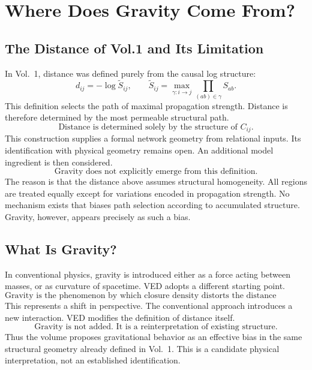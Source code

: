 \section{Where Does Gravity Come From?}
\label{sec:gravity_distance}

\subsection{The Distance of Vol.1 and Its Limitation}

In Vol.~1, distance was defined purely from the causal log structure:
\begin{equation}
  d_{ij} = -\log \tilde{S}_{ij},
  \qquad
  \tilde{S}_{ij} = \max_{\gamma: i\to j} \prod_{(ab)\in\gamma} S_{ab}.
\end{equation}
This definition selects the path of maximal propagation strength.
Distance is therefore determined by the most permeable structural path.
\begin{equation}
  \boxed{\text{Distance is determined solely by the structure of } C_{ij}.}
\end{equation}
This construction supplies a formal network geometry from relational inputs.
Its identification with physical geometry remains open.  An additional model
ingredient is then considered.
\begin{equation}
  \boxed{\text{Gravity does not explicitly emerge from this definition.}}
\end{equation}
The reason is that the distance above assumes structural homogeneity.
All regions are treated equally except for variations encoded in propagation strength.
No mechanism exists that biases path selection according to accumulated structure.
Gravity, however, appears precisely as such a bias.

\subsection{What Is Gravity?}

In conventional physics, gravity is introduced either as a force acting between
masses, or as curvature of spacetime. VED adopts a different starting point.
\begin{equation}
  \boxed{
    \text{Gravity is the phenomenon by which closure density distorts
    the distance structure.}
  }
\end{equation}
This represents a shift in perspective.
The conventional approach introduces a new interaction.
VED modifies the definition of distance itself.
\begin{equation}
  \boxed{\text{Gravity is not added. It is a reinterpretation of existing structure.}}
\end{equation}
Thus the volume proposes gravitational behavior as an effective bias in the
same structural geometry already defined in Vol.~1.  This is a candidate
physical interpretation, not an established identification.

